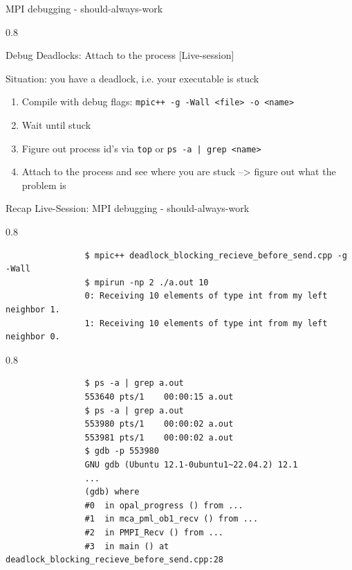 \documentclass[aspectratio=1610]{beamer}
\newenvironment{centeredblock}[2][0.8\textwidth]
{ %
	\begin{center}
		\begin{varwidth}{#1} %
			\begin{block}{#2}
				\centering
			}
			{ %
			\end{block}
		\end{varwidth}
	\end{center}
}
\begin{document}
	\begin{frame}[fragile]{MPI debugging - should-always-work}
		\begin{centeredblock}{Debug Deadlocks: Attach to the process [Live-session]}
			Situation: you have a deadlock, i.e. your executable is stuck
			\begin{enumerate}
				\item Compile with debug flags: \texttt{mpic++ -g -Wall <file> -o <name>}
				\item Wait until stuck
				\item Figure out process id's via \texttt{top} or \texttt{ps -a | grep <name>}
				\item Attach to the process and see where you are stuck --> figure out what the problem is
			\end{enumerate}
		\end{centeredblock}
	\end{frame}

	\begin{frame}[fragile]{Recap Live-Session: MPI debugging - should-always-work}
		\begin{centeredblock}{}
			\begin{verbatim}
				$ mpic++ deadlock_blocking_recieve_before_send.cpp -g -Wall
				$ mpirun -np 2 ./a.out 10
				0: Receiving 10 elements of type int from my left neighbor 1.
				1: Receiving 10 elements of type int from my left neighbor 0.
			\end{verbatim}
		\end{centeredblock}
		
		\begin{centeredblock}{}
			\begin{verbatim}
				$ ps -a | grep a.out
				553640 pts/1    00:00:15 a.out
				$ ps -a | grep a.out
				553980 pts/1    00:00:02 a.out
				553981 pts/1    00:00:02 a.out
				$ gdb -p 553980
				GNU gdb (Ubuntu 12.1-0ubuntu1~22.04.2) 12.1
				...
				(gdb) where
				#0  in opal_progress () from ...
				#1  in mca_pml_ob1_recv () from ...
				#2  in PMPI_Recv () from ...
				#3  in main () at deadlock_blocking_recieve_before_send.cpp:28
			\end{verbatim}
		\end{centeredblock}
	\end{frame}
\end{document}

